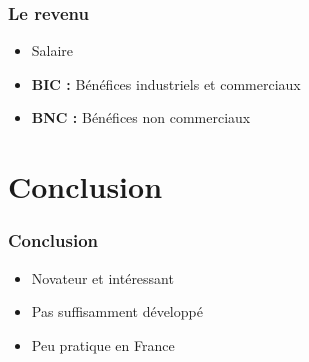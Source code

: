 \begin{frame}
\frametitle{Le revenu}

\begin{itemize}
    \itemsep1.5em
    \item Salaire
    \item \textbf{BIC :} Bénéfices industriels et commerciaux
    \item \textbf{BNC :} Bénéfices non commerciaux
\end{itemize}
\end{frame}


    \section{Conclusion}


\begin{frame}
\frametitle{Conclusion}
\begin{itemize}
    \itemsep1.5em
    \item Novateur et intéressant
    \item Pas suffisamment développé
    \item Peu pratique en France
\end{itemize}
\end{frame}
